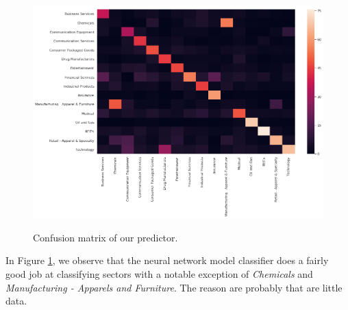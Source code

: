 \documentclass[a4paper,twoside]{article}
\begin{document}
\begin{landscape}
  \begin{figure}    
  \begin{center}
    \label{fig:confusion-matrix}
    \includegraphics[height=\textheight]{./figures/confusion_matrix.png}
    \caption{Confusion matrix of our predictor.}
    \end{center}
  \end{figure}
\end{landscape}

In Figure \ref{fig:confusion-matrix}, we observe that the neural network model
classifier does a fairly good job at classifying sectors with a notable
exception of \emph{Chemicals} and \emph{Manufacturing - Apparels and Furniture}. The
reason are probably that are little data.
\end{document}
